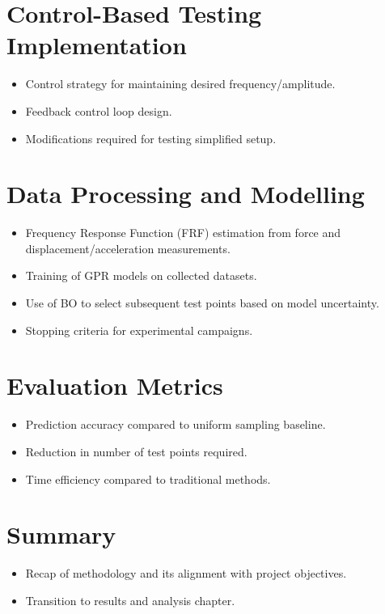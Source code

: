 \section{Control-Based Testing Implementation}
\begin{itemize}
    \item Control strategy for maintaining desired frequency/amplitude.
    \item Feedback control loop design.
    \item Modifications required for testing simplified setup.
\end{itemize}

\section{Data Processing and Modelling}
\begin{itemize}
    \item Frequency Response Function (FRF) estimation from force and displacement/acceleration measurements.
    \item Training of GPR models on collected datasets.
    \item Use of BO to select subsequent test points based on model uncertainty.
    \item Stopping criteria for experimental campaigns.
\end{itemize}

\section{Evaluation Metrics}
\begin{itemize}
    \item Prediction accuracy compared to uniform sampling baseline.
    \item Reduction in number of test points required.
    \item Time efficiency compared to traditional methods.
\end{itemize}

\section{Summary}
\begin{itemize}
    \item Recap of methodology and its alignment with project objectives.
    \item Transition to results and analysis chapter.
\end{itemize}
